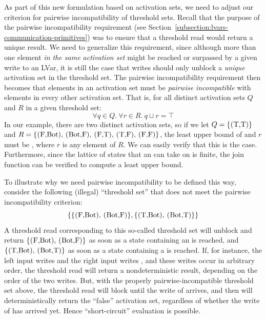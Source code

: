 As part of this new formulation based on activation sets, we need to
adjust our criterion for pairwise incompatibility of threshold sets.
Recall that the purpose of the pairwise incompatibility requirement
(see Section~\ref{subsection:lvars-communication-primitives}) was to
ensure that a threshold read would return a unique result.  We need to
generalize this requirement, since although more than one element
\emph{in the same activation set} might be reached or surpassed by a
given write to an LVar, it is still the case that writes should only
unblock a \emph{unique} activation set in the threshold set.  The
pairwise incompatibility requirement then becomes that elements in an
activation set must be \emph{pairwise incompatible} with elements in
every other activation set.  That is, for all distinct activation sets
$Q$ and $R$ in a given threshold set:
%
\[ \forall q \in Q.~\forall r \in R.~q \sqcup r = \top \]
%
In our  example, there are two distinct activation sets, so
if we let $Q = \{ \textrm{\il{(T,T)}} \}$ and $R = \{
\textrm{\il{(F,Bot)}, \il{(Bot,F)}, \il{(F,T)}, \il{(T,F)},
  \il{(F,F)}} \}$, the least upper bound of  and $r$ must be
, where $r$ is any element of $R$.  We can easily verify that
this is the case.  Furthermore, since the lattice of states that an
 can take on is finite, the join function can be verified to
compute a least upper bound.

To illustrate why we need pairwise incompatibility to be defined this
way, consider the following (illegal) ``threshold set'' that does not
meet the pairwise incompatibility criterion:
\[
\{ 
\{ \textrm{\il{(F,Bot)}, \il{(Bot,F)}} \},
\{ \textrm{\il{(T,Bot)}, \il{(Bot,T)}} \}
\}
\]
A threshold read corresponding to this so-called threshold set will
unblock and return $\{ \textrm{\il{(F,Bot)}, \il{(Bot,F)}} \}$ as soon
as a state containing an  is reached, and $\{
\textrm{\il{(T,Bot)}, \il{(Bot,T)}} \}$ as soon as a state containing
a  is reached.  If, for instance, the left input writes  and the right input writes , and these writes
occur in arbitrary order, the threshold read will return a
nondeterministic result, depending on the order of the two writes.
But, with the properly pairwise-incompatible threshold set above, the
threshold read will block until the write of  arrives,
and then will deterministically return the ``false'' activation set,
regardless of whether the write of  has arrived yet.
Hence ``short-circuit'' evaluation is possible.

